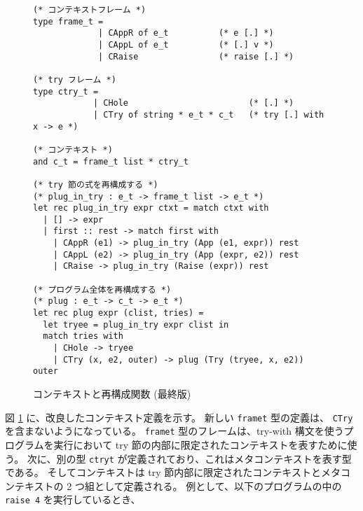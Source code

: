 \begin{figure}
\begin{spacing}{0.8}
\begin{verbatim}
(* コンテキストフレーム *)
type frame_t = 
             | CAppR of e_t          (* e [.] *)
             | CAppL of e_t          (* [.] v *)
             | CRaise                (* raise [.] *)

(* try フレーム *)
type ctry_t = 
            | CHole                        (* [.] *)
            | CTry of string * e_t * c_t   (* try [.] with x -> e *)

(* コンテキスト *)
and c_t = frame_t list * ctry_t

(* try 節の式を再構成する *)
(* plug_in_try : e_t -> frame_t list -> e_t *)
let rec plug_in_try expr ctxt = match ctxt with
  | [] -> expr
  | first :: rest -> match first with
    | CAppR (e1) -> plug_in_try (App (e1, expr)) rest
    | CAppL (e2) -> plug_in_try (App (expr, e2)) rest
    | CRaise -> plug_in_try (Raise (expr)) rest

(* プログラム全体を再構成する *)
(* plug : e_t -> c_t -> e_t *)
let rec plug expr (clist, tries) =
  let tryee = plug_in_try expr clist in
  match tries with
    | CHole -> tryee
    | CTry (x, e2, outer) -> plug (Try (tryee, x, e2)) outer
\end{verbatim}
\end{spacing}
  \caption{コンテキストと再構成関数 (最終版)}
  \label{figure:typec}
\end{figure}

図 \ref{figure:typec} に、改良したコンテキスト定義を示す。
新しい \texttt{frame\US t} 型の定義は、 \texttt{CTry} を含まないようになっている。
\texttt{frame\US t} 型のフレームは、try-with 構文を使うプログラムを実行において
try 節の内部に限定されたコンテキストを表すために使う。
次に、別の型 \texttt{ctry\US t} が定義されており、これはメタコンテキストを表す型である。
そしてコンテキストは try 節内部に限定されたコンテキストとメタコンテキストの 2 つ組として定義される。
例として、以下のプログラムの中の \texttt{raise 4} を実行しているとき、

